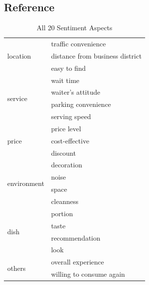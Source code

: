 \documentclass[compsoc]{IEEEtran}
\begin{document}
\subsection*{Reference}

\begin{table}[h]

\label{all-aspects}
\caption{All 20 Sentiment Aspects}

\centering
\begin{tabular}{ll}
\toprule
\multirow{3}{*}{location}    & traffic convenience             \\
                             & distance from business district \\
                             & easy to find                    \\ \hline 
\multirow{4}{*}{service}     & wait time                       \\
                             & waiter’s attitude               \\
                             & parking convenience             \\
                             & serving speed                   \\ \hline 
\multirow{3}{*}{price}       & price level                     \\
                             & cost-effective                  \\
                             & discount                        \\ \hline
\multirow{4}{*}{environment} & decoration                      \\ 
                             & noise                           \\
                             & space                           \\
                             & cleanness                       \\ \hline
\multirow{4}{*}{dish}        & portion                         \\
                             & taste                           \\
                             & recommendation                  \\
                             & look                            \\ \hline
\multirow{2}{*}{others}      & overall experience              \\
                             & willing to consume again \\
\bottomrule
\end{tabular}
\end{table}
\end{document}
